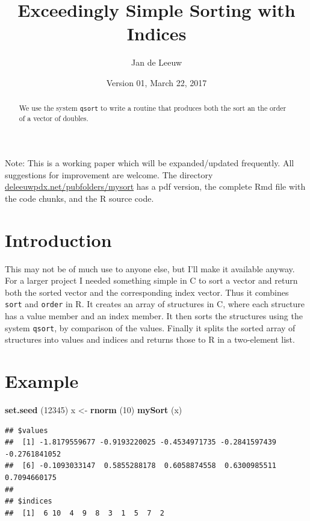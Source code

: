 \documentclass[12pt,]{article}
\title{Exceedingly Simple Sorting with Indices}
\author{Jan de Leeuw}
\date{Version 01, March 22, 2017}
\newenvironment{Shaded}{\begin{snugshade}}{\end{snugshade}}
\newcommand{\KeywordTok}[1]{\textcolor[rgb]{0.13,0.29,0.53}{\textbf{#1}}}
\newcommand{\DecValTok}[1]{\textcolor[rgb]{0.00,0.00,0.81}{#1}}
\newcommand{\StringTok}[1]{\textcolor[rgb]{0.31,0.60,0.02}{#1}}
\newcommand{\NormalTok}[1]{#1}
\begin{document}
\maketitle
\begin{abstract}
We use the system \texttt{qsort} to write a routine that produces both
the sort an the order of a vector of doubles.
\end{abstract}

{
\setcounter{tocdepth}{3}
\tableofcontents
}
Note: This is a working paper which will be expanded/updated frequently.
All suggestions for improvement are welcome. The directory
\href{http://deleeuwpdx.net/pubfolders/mysort}{deleeuwpdx.net/pubfolders/mysort}
has a pdf version, the complete Rmd file with the code chunks, and the R
source code.

\section{Introduction}\label{introduction}

This may not be of much use to anyone else, but I'll make it available
anyway. For a larger project I needed something simple in C to sort a
vector and return both the sorted vector and the corresponding index
vector. Thus it combines \texttt{sort} and \texttt{order} in R. It
creates an array of structures in C, where each structure has a value
member and an index member. It then sorts the structures using the
system \texttt{qsort}, by comparison of the values. Finally it splits
the sorted array of structures into values and indices and returns those
to R in a two-element list.

\section{Example}\label{example}

\begin{Shaded}
\begin{Highlighting}[]
\KeywordTok{set.seed}\NormalTok{ (}\DecValTok{12345}\NormalTok{)}
\NormalTok{x <-}\StringTok{ }\KeywordTok{rnorm}\NormalTok{ (}\DecValTok{10}\NormalTok{)}
\KeywordTok{mySort}\NormalTok{ (x)}
\end{Highlighting}
\end{Shaded}

\begin{verbatim}
## $values
##  [1] -1.8179559677 -0.9193220025 -0.4534971735 -0.2841597439 -0.2761841052
##  [6] -0.1093033147  0.5855288178  0.6058874558  0.6300985511  0.7094660175
## 
## $indices
##  [1]  6 10  4  9  8  3  1  5  7  2
\end{verbatim}
\end{document}
